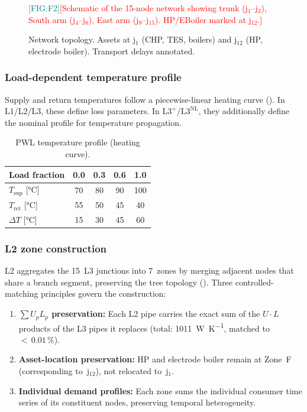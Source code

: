 \documentclass[review,3p]{elsarticle}
\newcommand{\placeholder}[1]{\textcolor{red}{[#1]}}
\newcommand{\Lplus}{\mathrm{L3}^{+}}
\newcommand{\Lnl}{\mathrm{L3}^{\mathrm{NL}}}
\newcommand{\figref}[1]{\textcolor{teal}{[FIG:#1]}}
\begin{document}
\begin{figure}[htbp]
  \centering
  \figref{F2}\quad\placeholder{Schematic of the 15-node network showing
  trunk (j$_1$--j$_3$), South arm (j$_4$--j$_8$), East arm
  (j$_9$--j$_{15}$). HP/EBoiler marked at j$_{12}$.}
  \caption{Network topology. Assets at j$_1$ (CHP, TES, boilers)
  and j$_{12}$ (HP, electrode boiler). Transport delays annotated.}
  \label{fig:topology}
\end{figure}

\subsubsection{Load-dependent temperature profile}
\label{sec:case_temp_profile}

Supply and return temperatures follow a piecewise-linear heating curve
(). In L1/L2/L3, these define loss parameters. In
$\Lplus$/$\Lnl$, they additionally define the nominal profile for
temperature propagation.

\begin{table}[htbp]
\centering
\caption{PWL temperature profile (heating curve).}
\label{tab:pwl}
\begin{tabular}{@{} l S[table-format=1.1] S[table-format=1.1]
                     S[table-format=1.1] S[table-format=1.1] @{}}
\toprule
Load fraction & {0.0} & {0.3} & {0.6} & {1.0} \\
\midrule
$T_{\mathrm{sup}}$ [\si{\celsius}] & 70 & 80 & 90 & 100 \\
$T_{\mathrm{ret}}$ [\si{\celsius}] & 55 & 50 & 45 & 40 \\
$\Delta T$ [\si{\celsius}]         & 15 & 30 & 45 & 60 \\
\bottomrule
\end{tabular}
\end{table}

\subsubsection{L2 zone construction}
\label{sec:case_l2_zones}

L2 aggregates the 15~L3 junctions into 7~zones by merging adjacent
nodes that share a branch segment, preserving the tree topology
(). Three controlled-matching principles govern
the construction:
%
\begin{enumerate}[nosep]
  \item \textbf{$\sum U_p L_p$ preservation:} Each L2 pipe carries
        the exact sum of the $U \cdot L$ products of the L3 pipes it
        replaces (total: \SI{1011}{\watt\per\kelvin}, matched to
        ${<}\,0.01\,\%$).
  \item \textbf{Asset-location preservation:} HP and electrode boiler
        remain at Zone~F (corresponding to~j$_{12}$), not relocated
        to~j$_1$.
  \item \textbf{Individual demand profiles:} Each zone sums the
        individual consumer time series of its constituent nodes,
        preserving temporal heterogeneity.
\end{enumerate}
\end{document}
